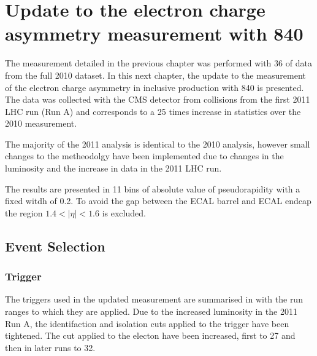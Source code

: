 \chapter[Electron Charge Asymmetry]{Update to the electron charge asymmetry
measurement with \unit{840}{\invpb} }

The measurement detailed in the previous chapter was performed with
\unit{36}{\invpb} of data from the full 2010 dataset. 
In this next chapter, the update to the measurement of the electron charge asymmetry in
inclusive \inclusiveWe production with \unit{840}{\invpb} is presented. 
The data was collected with the \ac{CMS} detector from collisions from the
first 2011 \ac{LHC} run (Run A) and corresponds to a 25 times increase in
statistics over the 2010 measurement.

The majority of the 2011 analysis is identical to the 2010 analysis,
however small changes to the metheodolgy have been implemented due to changes
in the luminosity and the increase in data in the 2011 \ac{LHC} run.

The results are presented in 11 bins of absolute value of pseudorapidity with a
fixed witdh of 0.2. To avoid the gap between the ECAL barrel and ECAL endcap the
region $1.4<|\eta|<1.6$ is excluded.

\section{Event Selection}

\subsection{Trigger}

The triggers used in the updated measurement are summarised in
 with the run ranges to which they are applied.
Due to the increased luminosity in the 2011 Run A, the identifaction and
isolation cuts applied to the trigger have been tightened. The \PT cut applied
to the electon have been increased, first to \unit{27}{\GeV} and then in later
runs to \unit{32}{\GeV}. 

